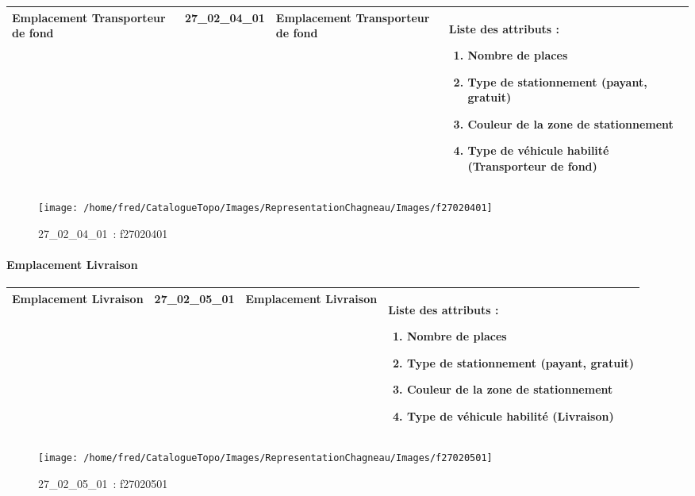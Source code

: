 \documentclass[12pt,titlepage]{book}
\begin{document}
\renewcommand{\arraystretch}{1.2}
\begin{supertabular}{|p{10cm}|c|p{13cm}|p{12cm}|}
 Emplacement Transporteur de fond & 27\_02\_04\_01 & Emplacement Transporteur de fond & Liste des attributs :
\begin{enumerate}
  \item Nombre de places  \item Type de stationnement (payant, gratuit)  \item Couleur de la zone de stationnement  \item Type de véhicule habilité (Transporteur de fond)\end{enumerate}
\\
\hline
\end{supertabular}
\begin{figure}[h!]
  \hfill         %
  \begin{minipage}[t]{3cm}
    \begin{center}
      \texttt{[image: /home/fred/CatalogueTopo/Images/RepresentationChagneau/Images/f27020401]}
      \caption[~27\_02\_04\_01]{\small{27\_02\_04\_01~:} \tiny{f27020401}}\label{f27020401}
    \end{center}
  \end{minipage}
\end{figure}


\paragraph{Emplacement Livraison}
\noindent
\vspace{\baselineskip}

\renewcommand{\arraystretch}{1.2}
\begin{supertabular}{|p{10cm}|c|p{13cm}|p{12cm}|}
 Emplacement Livraison & 27\_02\_05\_01 & Emplacement Livraison & Liste des attributs :
\begin{enumerate}
  \item Nombre de places  \item Type de stationnement (payant, gratuit)  \item Couleur de la zone de stationnement  \item Type de véhicule habilité (Livraison)\end{enumerate}
\\
\hline
\end{supertabular}
\begin{figure}[h!]
  \hfill         %
  \begin{minipage}[t]{3cm}
    \begin{center}
      \texttt{[image: /home/fred/CatalogueTopo/Images/RepresentationChagneau/Images/f27020501]}
      \caption[~27\_02\_05\_01]{\small{27\_02\_05\_01~:} \tiny{f27020501}}\label{f27020501}
    \end{center}
  \end{minipage}
\end{figure}
\end{document}

